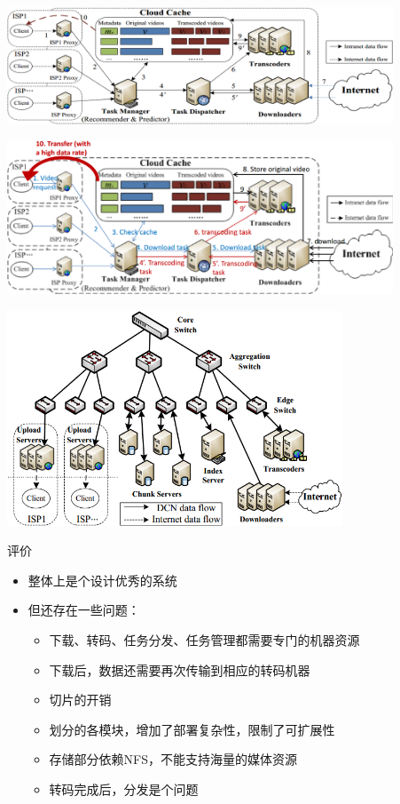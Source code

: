 \documentclass{beamer}
\begin{document}
\begin{frame}
\begin{center}
\includegraphics[width=11.5cm]{fig/cloud-transcoder_arch.png}
\end{center}
\end{frame}
\begin{frame}
\begin{center}
\includegraphics[width=11.5cm]{fig/cloud-transcoder_arch_details.png}
\end{center}
\end{frame}
\begin{frame}
\begin{center}
\includegraphics[width=10cm]{fig/cloud-cache_hardware.png}
\end{center}
\end{frame}
\begin{frame}{评价}
\begin{itemize}
	\item 整体上是个设计优秀的系统
	\item 但还存在一些问题：
	\begin{itemize}
		\item 下载、转码、任务分发、任务管理都需要专门的机器资源
		\item 下载后，数据还需要再次传输到相应的转码机器
		\item 切片的开销
		\item 划分的各模块，增加了部署复杂性，限制了可扩展性
		\item 存储部分依赖NFS，不能支持海量的媒体资源
		\item 转码完成后，分发是个问题
	\end{itemize}
\end{itemize}
\end{frame}
\end{document}
